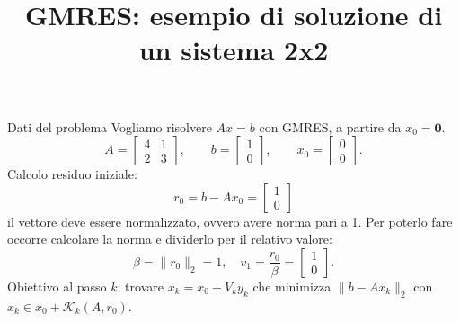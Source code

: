 \documentclass{beamer}
\title{GMRES: esempio di soluzione di un sistema 2x2}
\author{}
\institute{}
\date{}
\begin{document}
\frame{\titlepage}

\begin{frame}{Dati del problema}
Vogliamo risolvere $Ax=b$ con GMRES, a partire da $x_0=\bm{0}$.
\[
A=\begin{bmatrix}4&1\\[2pt]2&3\end{bmatrix},\qquad
b=\begin{bmatrix}1\\[2pt]0\end{bmatrix},\qquad
x_0=\begin{bmatrix}0\\[2pt]0\end{bmatrix}.
\]
Calcolo residuo iniziale:
\[
r_0=b-Ax_0=\begin{bmatrix}1\\[2pt]0\end{bmatrix}
\]
il vettore deve essere normalizzato, ovvero avere norma pari a 1. Per poterlo fare occorre calcolare la norma e dividerlo per il relativo valore:
\[
\beta=\|r_0\|_2=1,\quad
v_1=\frac{r_0}{\beta}=\begin{bmatrix}1\\[2pt]0\end{bmatrix}.
\]
Obiettivo al passo $k$: trovare $x_k=x_0+V_k y_k$ che minimizza $\|b-Ax_k\|_2$ con $x_k\in x_0+\mathcal{K}_k(A,r_0)$.
\end{frame}
\end{document}
